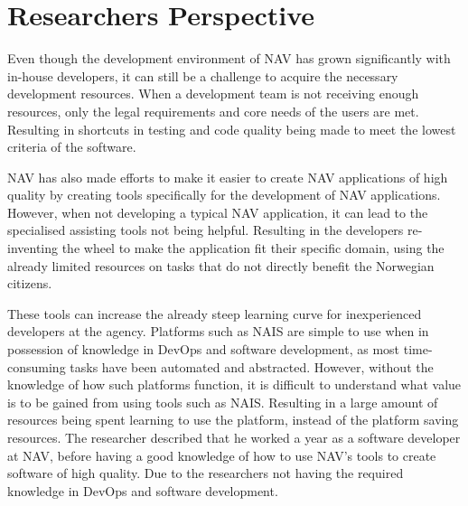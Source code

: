 


\newpage

\section{Researchers Perspective}
Even though the development environment of NAV has grown significantly with in-house developers, it can still be a challenge to acquire the necessary development resources. When a development team is not receiving enough resources, only the legal requirements and core needs of the users are met. Resulting in shortcuts in testing and code quality being made to meet the lowest criteria of the software.

NAV has also made efforts to make it easier to create NAV applications of high quality by creating tools specifically for the development of NAV applications. However, when not developing a typical NAV application, it can lead to the specialised assisting tools not being helpful. Resulting in the developers re-inventing the wheel to make the application fit their specific domain, using the already limited resources on tasks that do not directly benefit the Norwegian citizens.

These tools can increase the already steep learning curve for inexperienced developers at the agency. Platforms such as NAIS are simple to use when in possession of knowledge in DevOps and software development, as most time-consuming tasks have been automated and abstracted. However, without the knowledge of how such platforms function, it is difficult to understand what value is to be gained from using tools such as NAIS. Resulting in a large amount of resources being spent learning to use the platform, instead of the platform saving resources. The researcher described that he worked a year as a software developer at NAV, before having a good knowledge of how to use NAV's tools to create software of high quality. Due to the researchers not having the required knowledge in DevOps and software development. 


